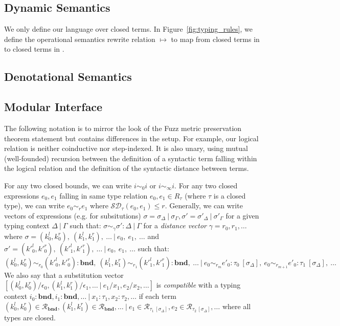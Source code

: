 

\subsection{Dynamic Semantics}
We only define our language over closed terms. In Figure~\ref{fig:typing_rules},
we define the operational semantics rewrite relation $\mapsto$ to map from
closed terms in \Lang to closed terms in \Lang.



\subsection{Denotational Semantics}


\subsection{Modular Interface}
The following notation is to mirror the look of the Fuzz metric preservation
theorem statement but contains differences in the setup. For example, our
logical relation is neither coinductive nor step-indexed. It is also unary,
using mutual (well-founded) recursion between the definition of a syntactic term
falling within the logical relation and the definition of the syntactic distance
between terms.

For any two closed bounds, we can write $i \sim_0 i$ or $i \sim_{\infty} i$. 
For any two closed expressions $e_0, e_1$ falling in same type relation $e_0,
e_1 \in R_\tau$ (where $\tau$ is a closed type), we can write $e_0 \sim_r e_1$
where $\mathcal{SD}_{\tau}(e_0, e_1) \leq r$. 
Generally, we can write vectors of expressions (e.g. for subsitutions) $\sigma =
\sigma_{\Delta} \ | \ \sigma_{\Gamma}, \sigma' = \sigma'_{\Delta} \ | \
\sigma'_{\Gamma}$
for a given typing context $\Delta \ | \ \Gamma$ such that: $\sigma \sim_{\gamma} \sigma'
: \Delta \ | \ \Gamma$ for a \textit{distance vector}
$\gamma = r_0, r_1, \ldots$
where
$\sigma = (k^l_0, k^r_0),~(k^l_1, k^r_1),~\ldots \ | \ e_0,~e_1,~\ldots$ 
and 
$\sigma' = (k'^l_0, k'^r_0),~(k'^l_1, k'^r_1),~\ldots \ | \ e_0,~e_1,~\ldots$ 
such that:
$$
(k^l_0, k^r_0) \sim_{r_0} (k'^l_0, k'^r_0) : \mathbf{bnd},~(k^l_1, k^r_1) \sim_{r_1} (k'^l_1, k'^r_1) : \mathbf{bnd},~\ldots \
| \ e_0 \sim_{r_m} e'_0 :
\tau_0~[\sigma_{\Delta}],~e_0 \sim_{r_{m+1}} e'_0 :
\tau_1~[\sigma_{\Delta}],~\ldots
$$
We also say that a substitution vector 
$[(k^l_0, k^r_0) / \epsilon_0, (k^l_1, k^r_1) / \epsilon_1, \ldots \ | \ e_1/x_1, e_2/x_2, \ldots]$ 
is \textit{compatible} with a typing context 
$i_0 : \mathbf{bnd}, i_1 : \mathbf{bnd}, \ldots \ | \ x_1 : \tau_1, x_2 : \tau_2, \ldots$
if each term 
$(k^l_0, k^r_0) \in \mathcal{R}_{\mathbf{bnd}}, 
(k^l_1, k^r_1) \in \mathcal{R}_{\mathbf{bnd}}, 
\ldots \ | 
\ e_1 \in \mathcal{R}_{\tau_1~[\sigma_{\Delta}]}, 
e_2 \in \mathcal{R}_{\tau_2~[\sigma_{\Delta}]}, \ldots$ where all types are closed.

